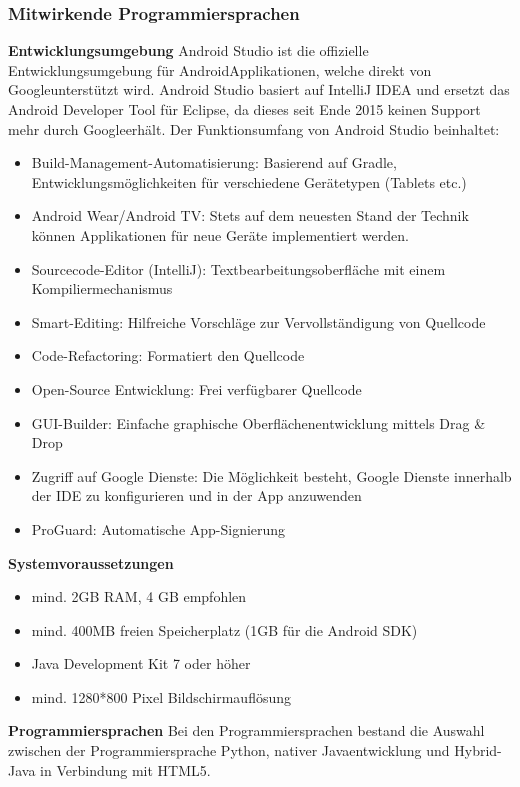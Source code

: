 \subsubsection{Mitwirkende Programmiersprachen}
\label{subsec:androidsprachen}
\textbf{Entwicklungsumgebung\newline}
Android Studio ist die offizielle Entwicklungsumgebung für Android\texttrademark Applikationen, welche direkt von Google\texttrademark unterstützt wird.
Android Studio basiert auf IntelliJ IDEA und ersetzt das Android Developer Tool für Eclipse, da dieses seit Ende 2015 keinen Support mehr durch Google\texttrademark erhält. Der Funktionsumfang von Android Studio beinhaltet:
\begin{itemize}
	\item Build-Management-Automatisierung: Basierend auf Gradle, Entwicklungsmöglichkeiten für verschiedene Gerätetypen (Tablets etc.)
	\item Android Wear/Android TV: Stets auf dem neuesten Stand der Technik können Applikationen für neue Geräte implementiert werden.
	\item Sourcecode-Editor (IntelliJ): Textbearbeitungsoberfläche mit einem Kompiliermechanismus
	\item Smart-Editing: Hilfreiche Vorschläge zur Vervollständigung von Quellcode
	\item Code-Refactoring: Formatiert den Quellcode
	\item Open-Source Entwicklung: Frei verfügbarer Quellcode
	\item GUI-Builder: Einfache graphische Oberflächenentwicklung mittels Drag \& Drop
	\item Zugriff auf Google Dienste: Die Möglichkeit besteht, Google Dienste innerhalb der IDE zu konfigurieren und in der App anzuwenden
	\item ProGuard: Automatische App-Signierung
\end{itemize}

\textbf{Systemvoraussetzungen\newline}
\begin{itemize}
	\item mind. 2GB RAM, 4 GB empfohlen
	\item mind. 400MB freien Speicherplatz (1GB für die Android SDK)
	\item Java Development Kit 7 oder höher
	\item mind. 1280*800 Pixel Bildschirmauflösung
\end{itemize}
\textbf{Programmiersprachen\newline}
Bei den Programmiersprachen bestand die Auswahl zwischen der Programmiersprache Python, 
nativer Javaentwicklung und Hybrid-Java in Verbindung mit HTML5.


